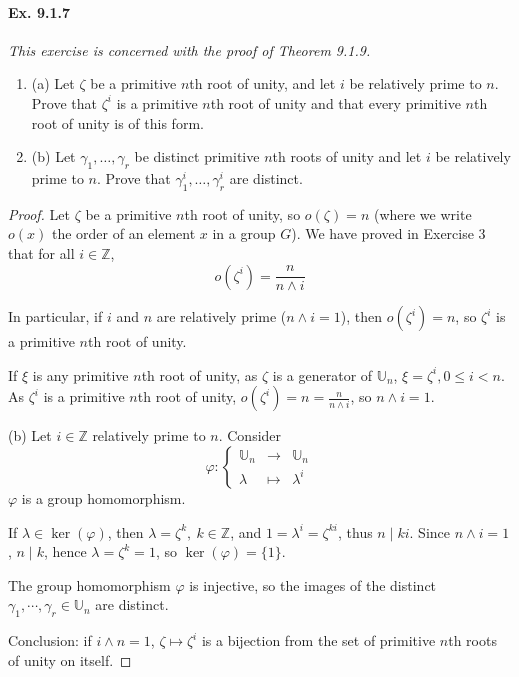 \documentclass[11pt,a4paper]{article}
\newcommand{\be} {\begin{enumerate}}
\newcommand{\ee} {\end{enumerate}}
\newcommand{\Z}{\mathbb{Z}}
\newcommand{\U}{\mathbb{U}}
\begin{document}
\paragraph{Ex. 9.1.7}

{\it This exercise is concerned with the proof of Theorem 9.1.9.
\be
\item[(a)] Let $\zeta$ be a primitive $n$th root of unity, and let $i$ be relatively prime to $n$. Prove that $\zeta^i$ is a primitive $n$th root of unity and that every primitive $n$th root of unity is of this form.
\item[(b)] Let $\gamma_1,\ldots,\gamma_r$ be distinct primitive $n$th roots of unity and let $i$ be relatively prime to $n$. Prove that $\gamma_1^i,\ldots,\gamma_r^i$ are distinct.
\ee
}

\begin{proof}
Let $\zeta$ be a primitive $n$th root of unity, so $o(\zeta) = n$ (where we write $o(x)$ the order of an element $x$ in a group $G$).
We have proved in Exercise 3 that for all $i\in \Z$,
$$o(\zeta^i) = \frac{n}{n\wedge i}$$

In particular, if $i$ and $n$ are relatively prime ($n \wedge i = 1$), then $o(\zeta^i) = n$, so $\zeta^i$ is a primitive $n$th root of unity.

If $\xi$ is any primitive $n$th root of unity, as $\zeta$ is a generator of $\U_n$, $\xi= \zeta^i, 0 \leq i <n$. As $\zeta^i$ is a primitive $n$th root of unity, $o(\zeta^i)=n = \frac{n}{n\wedge i}$, so  $n\wedge i=1$. 
\item[(b)]
Let $i \in \Z$ relatively prime to $n$. Consider
$$
\varphi :
\left\{
\begin{array}{ccc}
   \U_n&  \to &\U_n   \\
    \lambda& \mapsto   &     \lambda^i
\end{array}
\right.
$$
$\varphi$ is a group homomorphism.

If $\lambda \in \ker(\varphi)$, then $\lambda = \zeta^k,\  k \in \Z$, and $1 = \lambda^i = \zeta^{ki}$, thus $n\mid ki$. Since $n \wedge i =1$, $n\mid k$, hence $\lambda = \zeta^k = 1$, so $ \ker(\varphi) = \{1\}$.

The group homomorphism $\varphi$ is injective, so the images of the distinct $\gamma_1,\cdots,\gamma_r \in \U_n$ are distinct.

Conclusion:  if $i\wedge n = 1$, $\zeta \mapsto \zeta^i$ is a bijection from the set of primitive $n$th roots of unity on itself.

\end{proof}
\end{document}
